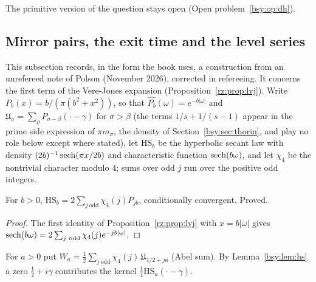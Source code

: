 \noindent The primitive version of the question stays open (Open problem~\ref{bsy:op:dh}).

\subsection{Mirror pairs, the exit time and the level series}\label{bsy:sec:mirror}

This subsection records, in the form the book uses, a construction from an unrefereed note of Polson (November 2026), corrected in refereeing. It concerns the first term of the Vere-Jones expansion (Proposition~\ref{rz:prop:lvj}). Write $P_b(x)=b/(\pi(b^2+x^2))$, so that $\widehat{P_b}(\omega)=e^{-b|\omega|}$ and $\mathfrak U_\sigma=\sum_\rho P_{\sigma-\beta}(\cdot-\gamma)$ for $\sigma>\beta$ (the terms $1/s+1/(s-1)$ appear in the prime side expression of $\pi m_\sigma$, the density of Section~\ref{bsy:sec:thorin}, and play no role below except where stated), let $\mathrm{HS}_b$ be the hyperbolic secant law with density $(2b)^{-1}\operatorname{sech}(\pi x/2b)$ and characteristic function $\operatorname{sech}(b\omega)$, and let $\chi_4$ be the nontrivial character modulo $4$; sums over odd $j$ run over the positive odd integers.

\begin{lemma}\label{bsy:lem:hs}
For $b>0$, $\mathrm{HS}_b=2\sum_{j\ \mathrm{odd}}\chi_4(j)P_{jb}$, conditionally convergent. Proved.
\end{lemma}

\begin{proof}
The first identity of Proposition~\ref{rz:prop:lvj} with $x=b|\omega|$ gives $\sech(b\omega)=2\sum_{j\ \mathrm{odd}}\chi_4(j)e^{-jb|\omega|}$.
\end{proof}

For $a>0$ put $W_a=\tfrac12\sum_{j\ \mathrm{odd}}\chi_4(j)\,\mathfrak U_{1/2+ja}$ (Abel sum). By Lemma~\ref{bsy:lem:hs} a zero $\frac12+i\gamma$ contributes the kernel $\frac14\mathrm{HS}_a(\cdot-\gamma)$.

